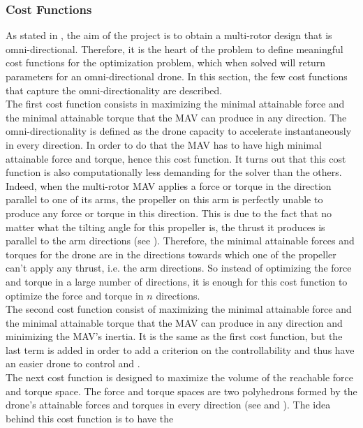 \subsubsection{Cost Functions}
\label{sec:cost_functions}
As stated in , the aim of the project is to obtain a multi-rotor
design that is omni-directional. Therefore, it is the heart of the problem to
define meaningful cost functions for the optimization problem, which when
solved will return parameters for an omni-directional drone. In this section,
the few cost functions that capture the omni-directionality are described.\\
The first cost function consists in maximizing the minimal attainable force and
the minimal attainable torque that the MAV can produce in any direction. The
omni-directionality is defined as the drone capacity to accelerate instantaneously
in every direction. In order to do that the MAV has to have high minimal attainable
force and torque, hence this cost function. It turns out that this cost function is also
computationally less demanding for the solver than the others. Indeed, when the multi-rotor
MAV applies a force or torque in the direction parallel to one of its arms, the
propeller on this arm is perfectly unable to produce any force or torque in this
direction. This is due to the fact that no matter what the tilting angle for this
propeller is, the thrust it produces is parallel to the arm directions (see ).
Therefore, the minimal attainable forces and torques for the drone are in the directions
towards which one of the propeller can't apply any thrust, i.e. the arm directions.
So instead of optimizing the force and torque in a large number of directions, it is
enough for this cost function to optimize the force and torque in $n$ directions.\\
The second cost function consist of maximizing the minimal attainable force
and the minimal attainable torque that the MAV can produce in any direction
and minimizing the MAV’s inertia. It is the same as the first cost function, but
the last term is added in order to add a criterion on the controllability and thus
have an easier drone to control and .\\
The next cost function is designed to maximize the volume of the reachable
force and torque space. The force and torque spaces are two polyhedrons formed
by the drone’s attainable forces and torques in every direction (see 
and ). The idea behind this cost function is to have the
